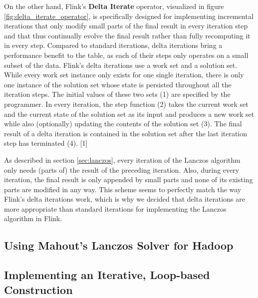 On the other hand, Flink's \textbf{Delta Iterate} operator, visualized in figure 
\ref{fig:delta_iterate_operator}, is specifically designed for implementing incremental
iterations that only modify small parts of the final result in every iteration step and that 
thus continually evolve the final result rather than fully recomputing it in every step.
Compared to standard iterations, delta iterations bring a performance benefit to the table,
as each of their steps only operates on a small subset of the data. Flink's delta iterations
use a work set and a solution set. While every work set instance only exists for one single
iteration, there is only one instance of the solution set whose state is persisted throughout 
all the iteration steps. The initial values of these two sets (1) are specified by the 
programmer. In every iteration, the step function (2) takes the current work set and the current
state of the solution set as its input and produces a new work set while also (optionally)
updating the contents of the solution set (3). The final result of a delta iteration is
contained in the solution set after the last iteration step has terminated (4). [1]


As described in section \ref{sec:lanczos}, every iteration of the Lanczos algorithm only needs
(parts of) the result of the preceding iteration. Also, during every iteration, the final result
is only appended by small parts and none of its existing parts are modified in any way. This
scheme seems to perfectly match the way Flink's delta iterations work, which is why we decided
that delta iterations are more appropriate than standard iterations for implementing the Lanczos
algorithm in Flink.

\subsection{Using Mahout's Lanczos Solver for Hadoop}

\subsection{Implementing an Iterative, Loop-based Construction}


